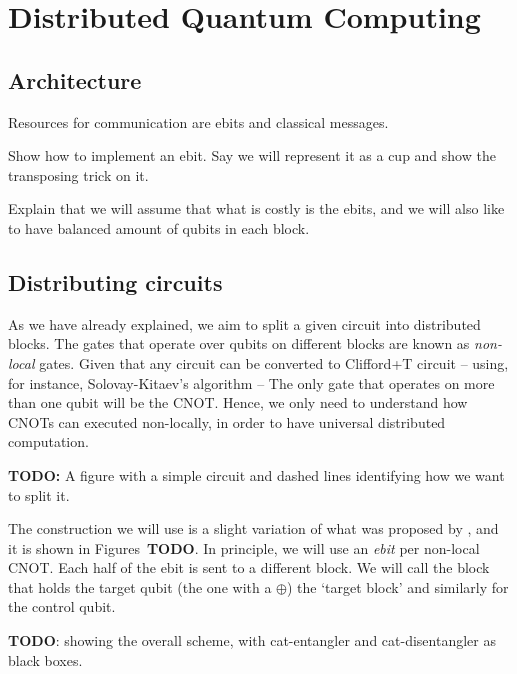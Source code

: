 \chapter{Distributed Quantum Computing}
\label{chap:Distributed}

\section{Architecture}
\label{DQC_Architecture}

Resources for communication are ebits and classical messages.

Show how to implement an ebit. Say we will represent it as a cup and show the transposing trick on it.

Explain that we will assume that what is costly is the ebits, and we will also like to have balanced amount of qubits in each block.

\section{Distributing circuits}
\label{IntroDistributing}

As we have already explained, we aim to split a given circuit into distributed blocks. The gates that operate over qubits on different blocks are known as \textit{non-local} gates. Given that any circuit can be converted to Clifford+T circuit -- using, for instance, Solovay-Kitaev's algorithm -- The only gate that operates on more than one qubit will be the CNOT. Hence, we only need to understand how CNOTs can executed non-locally, in order to have universal distributed computation.

\textbf{TODO:} A figure with a simple circuit and dashed lines identifying how we want to split it.

The construction we will use is a slight variation of what was proposed by \citet{NonLocalCNOT}, and it is shown in Figures~\textbf{TODO}. In principle, we will use an \textit{ebit} per non-local CNOT. Each half of the ebit is sent to a different block. We will call the block that holds the target qubit (the one with a \(\oplus\)) the `target block' and similarly for the control qubit. 

\textbf{TODO}: showing the overall scheme, with cat-entangler and cat-disentangler as black boxes.

